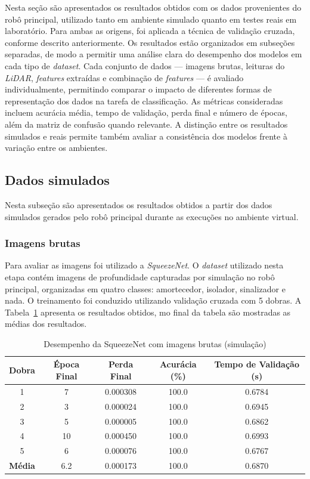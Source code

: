 Nesta seção são apresentados os resultados obtidos com os dados provenientes do robô principal, utilizado tanto em ambiente simulado quanto em testes reais em laboratório. Para ambas as origens, foi aplicada a técnica de validação cruzada, conforme descrito anteriormente. Os resultados estão organizados em subseções separadas, de modo a permitir uma análise clara do desempenho dos modelos em cada tipo de \textit{dataset}. Cada conjunto de dados — imagens brutas, leituras do \textit{LiDAR}, \textit{features} extraídas e combinação de \textit{features} — é avaliado individualmente, permitindo comparar o impacto de diferentes formas de representação dos dados na tarefa de classificação. As métricas consideradas incluem acurácia média, tempo de validação, perda final e número de épocas, além da matriz de confusão quando relevante. A distinção entre os resultados simulados e reais permite também avaliar a consistência dos modelos frente à variação entre os ambientes.

\subsection{Dados simulados}

Nesta subseção são apresentados os resultados obtidos a partir dos dados simulados gerados pelo robô principal durante as execuções no ambiente virtual.

\subsubsection{Imagens brutas}

Para avaliar as imagens foi utilizado a \textit{SqueezeNet}. O \textit{dataset} utilizado nesta etapa contém imagens de profundidade capturadas por simulação no robô principal, organizadas em quatro classes: amortecedor, isolador, sinalizador e nada. O treinamento foi conduzido utilizando validação cruzada com 5 dobras. A Tabela~\ref{tab:squeezenet_camera} apresenta os resultados obtidos, mo final da tabela são mostradas as médias dos resultados.

\begin{table}[H]
\centering
\caption{Desempenho da SqueezeNet com imagens brutas (simulação)}
\label{tab:squeezenet_camera}
\begin{tabular}{ccccc}
\hline
\textbf{Dobra} & \textbf{Época Final} & \textbf{Perda Final} & \textbf{Acurácia (\%)} & \textbf{Tempo de Validação (s)} \\
\hline
1 & 7  & 0.000308  & 100.0 & 0.6784 \\
2 & 3  & 0.000024  & 100.0 & 0.6945 \\
3 & 5  & 0.000005  & 100.0 & 0.6862 \\
4 & 10 & 0.000450  & 100.0 & 0.6993 \\
5 & 6  & 0.000076  & 100.0 & 0.6767 \\
\hline
\textbf{Média} & 6.2 & 0.000173 & 100.0 & 0.6870 \\
\hline
\end{tabular}
\fonte{}
\end{table}


